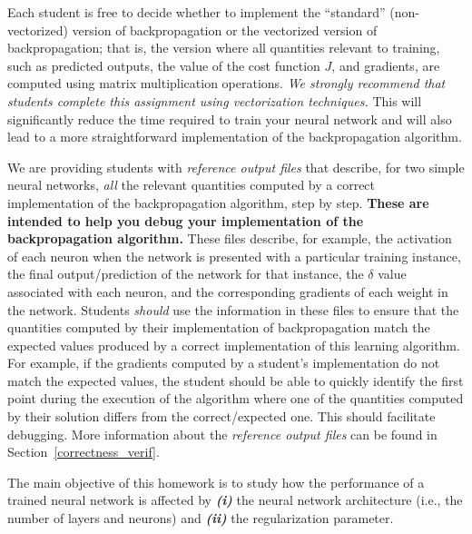 \documentclass{article}
\begin{document}
\noindent Each student is free to decide whether to implement the ``standard'' (non-vectorized) version of backpropagation or the vectorized version of backpropagation; that is, the version where all quantities relevant to training, such as predicted outputs, the value of the cost function $J$, and gradients, are computed using matrix multiplication operations. \textit{We strongly recommend that students complete this assignment using vectorization techniques.} This will significantly reduce the time required to train your neural network and will also lead to a more straightforward implementation of the backpropagation algorithm.

\vspace{0.75cm}

\noindent We are providing students with \textit{reference output files} that describe, for two simple neural networks, \textit{all} the relevant quantities computed by a correct implementation of the backpropagation algorithm, step by step. \textbf{These are intended to help you debug your implementation of the backpropagation algorithm.} These files describe, for example, the activation of each neuron when the network is presented with a particular training instance, the final output/prediction of the network for that instance, the $\delta$ value associated with each neuron, and the corresponding gradients of each weight in the network. Students \textit{should} use the information in these files to ensure that the quantities computed by their implementation of backpropagation match the expected values produced by a correct implementation of this learning algorithm. For example, if the gradients computed by a student's implementation do not match the expected values, the student should be able to quickly identify the first point during the execution of the algorithm where one of the quantities computed by their solution differs from the correct/expected one. This should facilitate debugging. More information about the \textit{reference output files} can be found in Section~\ref{correctness_verif}.





\newpage

\vspace{0.75cm}

\noindent The main objective of this homework is to study how the performance of a trained neural network is affected by \textit{\textbf{(i)}} the neural network architecture (i.e., the number of layers and neurons) and \textit{\textbf{(ii)}} the regularization parameter.
\vspace{0.1cm}
\end{document}
